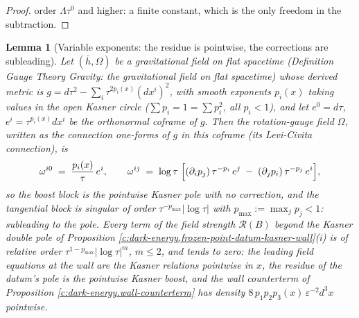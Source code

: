 \documentclass[11pt]{article}
\newtheorem{lemma}[theorem]{Lemma}
\theoremstyle{definition}
\theoremstyle{plain}
\newcommand{\changedmark}[2]{\marginpar{\raggedright\scriptsize\color{#1}#2}}
\providecommand{\hb}{}\renewcommand{\hb}{\bar{h}}
\begin{document}
\begin{proof}
order $\Lambda\tau^0$ and higher: a finite constant, which is the only freedom in the subtraction.

\end{proof}

\begin{lemma}[Variable exponents: the residue is pointwise, the corrections are subleading]\label{c:dark-energy.variable-exponents-residue-pointwise-corrections-are}
\changedmark{gray}{reworded}
Let $(\hb, \Omega)$ be a gravitational field on flat spacetime (Definition \emph{Gauge Theory Gravity: the gravitational field on flat spacetime}) whose derived metric is $g = d\tau^2 - \sum_i\tau^{2p_i(x)}(dx^i)^2$, with smooth exponents $p_i(x)$ taking values in the open Kasner circle ($\sum p_i = 1 = \sum p_i^2$, all $p_i < 1$), and let $e^0 = d\tau$, $e^i = \tau^{p_i(x)}dx^i$ be the orthonormal coframe of $g$. Then the rotation-gauge field $\Omega$, written as the connection one-forms of $g$ in this coframe (its Levi-Civita connection), is
\[
\omega^{i0} \;=\; \frac{p_i(x)}{\tau}\,e^i, \qquad
\omega^{ij} \;=\; \log\tau\;\Bigl[(\partial_i p_j)\,\tau^{-p_i}\,e^j \;-\; (\partial_j p_i)\,\tau^{-p_j}\,e^i\Bigr] ,
\]
so the boost block is the pointwise Kasner pole with no correction, and the tangential block is singular of order $\tau^{-p_{\max}}|\log\tau|$ with $p_{\max} := \max_j p_j < 1$: subleading to the pole. Every term of the field strength $\mathcal{R}(B)$ beyond the Kasner double pole of Proposition \ref{c:dark-energy.frozen-point-datum-kasner-wall}(i) is of relative order $\tau^{1-p_{\max}}|\log\tau|^m$, $m \leq 2$, and tends to zero: the leading field equations at the wall are the Kasner relations pointwise in $x$, the residue of the datum's pole is the pointwise Kasner boost, and the wall counterterm of Proposition \ref{c:dark-energy.wall-counterterm} has density $8\,p_1p_2p_3(x)\,\varepsilon^{-2}d^3x$ pointwise.
\end{lemma}
\end{document}
